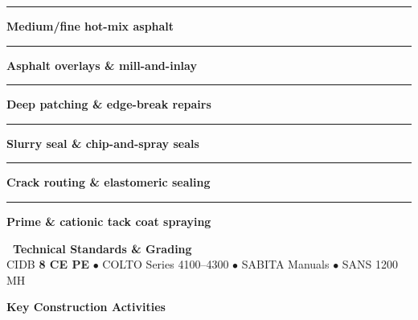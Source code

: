 \documentclass[a4paper,11pt]{article}
\begin{document}
\begin{minipage}[t]{0.34\textwidth}
    \vspace{0pt}
    \begin{tcolorbox}[
        enhanced, colback=mhoffwhite, colframe=mhnavy, boxrule=0.9pt, arc=4pt,
        title={\bfseries\color{white}\faLayerGroup\ Scope of Work},
        colbacktitle=mhnavy, left=7pt, right=7pt, top=5pt, bottom=5pt, drop shadow=black!5
    ]
        \fontsize{7.8pt}{10.8pt}\selectfont
        \textcolor{mhnavy}{\rule{3.5pt}{3.5pt}}\hspace{4pt}\textbf{Medium/fine hot-mix asphalt}\\
        \textcolor{mhnavy}{\rule{3.5pt}{3.5pt}}\hspace{4pt}\textbf{Asphalt overlays \& mill-and-inlay}\\
        \textcolor{mhnavy}{\rule{3.5pt}{3.5pt}}\hspace{4pt}\textbf{Deep patching \& edge-break repairs}\\
        \textcolor{mhnavy}{\rule{3.5pt}{3.5pt}}\hspace{4pt}\textbf{Slurry seal \& chip-and-spray seals}\\
        \textcolor{mhnavy}{\rule{3.5pt}{3.5pt}}\hspace{4pt}\textbf{Crack routing \& elastomeric sealing}\\
        \textcolor{mhnavy}{\rule{3.5pt}{3.5pt}}\hspace{4pt}\textbf{Prime \& cationic tack coat spraying}
    \end{tcolorbox}

    \vspace{0.12cm}

    \begin{tcolorbox}[
        enhanced, colback=white, colframe=mhlightgray, boxrule=0.8pt, arc=4pt,
        left=6pt, right=6pt, top=5pt, bottom=5pt, drop shadow=black!3
    ]
        {\fontsize{7.5pt}{9.6pt}\selectfont\bfseries\color{mhnavy}\faCheckDouble\ Technical Standards \& Grading}\\[2pt]
        {\fontsize{7.3pt}{9.4pt}\selectfont\color{mhtextmuted}
        CIDB \textbf{8 CE PE} $\bullet$ COLTO Series 4100--4300 $\bullet$ SABITA Manuals $\bullet$ SANS 1200 MH}
    \end{tcolorbox}
\end{minipage}

\vfill

{\large\bfseries\color{mhnavy} Key Construction Activities}
\vspace{0.10cm}
\end{document}
